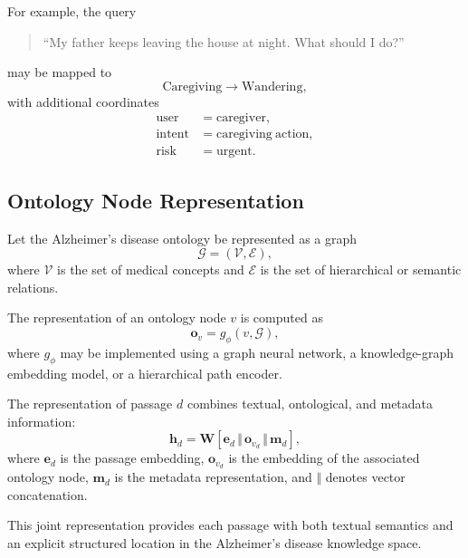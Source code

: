 \documentclass{article}
\begin{document}
For example, the query
\begin{quote}
``My father keeps leaving the house at night. What should I do?''
\end{quote}
may be mapped to
\begin{equation}
    \mathrm{Caregiving}
    \rightarrow
    \mathrm{Wandering},
\end{equation}
with additional coordinates
\begin{equation}
\begin{split}
    \mathrm{user} &= \mathrm{caregiver},\\
    \mathrm{intent} &= \mathrm{caregiving\ action},\\
    \mathrm{risk} &= \mathrm{urgent}.
\end{split}
\end{equation}

\subsection{Ontology Node Representation}

Let the Alzheimer's disease ontology be represented as a graph
\begin{equation}
    \mathcal{G} = (\mathcal{V},\mathcal{E}),
\end{equation}
where $\mathcal{V}$ is the set of medical concepts and $\mathcal{E}$ is the set of hierarchical or semantic relations.

The representation of an ontology node $v$ is computed as
\begin{equation}
    \mathbf{o}_v = g_{\phi}(v,\mathcal{G}),
\end{equation}
where $g_{\phi}$ may be implemented using a graph neural network, a 
knowledge-graph embedding model, or a hierarchical path encoder.

The representation of passage $d$ combines textual, ontological, and metadata 
information:
\begin{equation}
    \mathbf{h}_d =
    \mathbf{W}
    \left[
    \mathbf{e}_d
    \,\Vert\,
    \mathbf{o}_{v_d}
    \,\Vert\,
    \mathbf{m}_d
    \right],
\end{equation}
where $\mathbf{e}_d$ is the passage embedding, $\mathbf{o}_{v_d}$ is the 
embedding of the associated ontology node, $\mathbf{m}_d$ is the metadata 
representation, and $\Vert$ denotes vector concatenation.

This joint representation provides each passage with both textual semantics 
and an explicit structured location in the Alzheimer's disease knowledge 
space.
\end{document}
